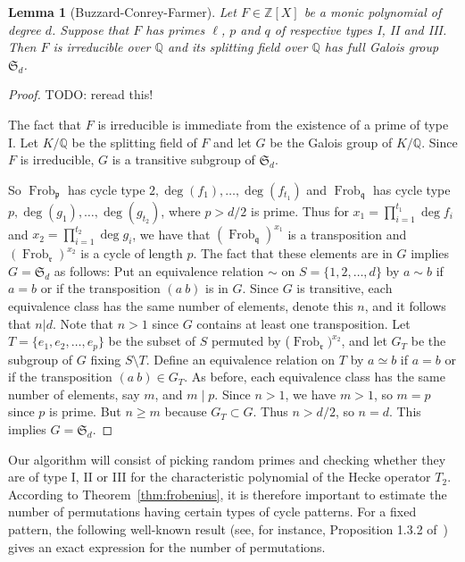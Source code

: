 \documentclass[11pt]{article}
\theoremstyle{plain}
\newtheorem{lemma}[theorem]{Lemma}
\theoremstyle{definition}
\theoremstyle{remark}
\numberwithin{equation}{section}
\newcommand{\ZZ}{\mathbb{Z}}
\newcommand{\QQ}{\mathbb{Q}}
\renewcommand{\SS}{\mathfrak{S}}
\newcommand{\Frob}{\operatorname{Frob}}
\begin{document}
\begin{lemma}[Buzzard-Conrey-Farmer]
  Let $F\in\ZZ[X]$ be a monic polynomial of degree $d$.  Suppose that $F$ has
  primes $\ell$, $p$ and $q$ of respective types I, II and III.  Then $F$
  is irreducible over $\QQ$ and its splitting field over $\QQ$ has full Galois
  group $\SS_d$.
\end{lemma}
\begin{proof}
  TODO: reread this!

  The fact that $F$ is irreducible is immediate from the existence of a prime of type
  I. 
  Let $K/\QQ$ be the splitting field of $F$ and let $G$ be the Galois group of
  $K/\QQ$.  Since $F$ is irreducible, $G$ is a transitive subgroup of $\SS_d$. 

  So $\Frob_{\mathfrak{p}}$ has cycle type $2,\deg(f_1),\ldots,\deg(f_{t_1})$ and
  $\Frob_{\mathfrak{q}}$ has cycle type $p,\deg(g_1),\ldots,\deg(g_{t_2})$, where 
  $p>d/2$ is prime. Thus for $x_1=\prod_{i=1}^{t_1}\deg f_i$ and $x_2=\prod_{i=1}^{t_2}\deg g_i$,
  we have that $(\Frob_{\mathfrak{q}})^{x_1}$ is a transposition and 
  $(\Frob_{\mathfrak{r}})^{x_2}$
  is a cycle of length $p$. The fact that these elements are in $G$ implies $G=\SS_d$ as follows:
  Put an equivalence relation $\sim$ on $S=\{1,2,\ldots,d\}$ by $a\sim b$ if $a=b$ or if the
  transposition $(a~b)$ is in $G$. Since $G$ is
  transitive, each equivalence class has the same number of elements, denote this
  $n$, and it follows that $n|d$. Note that $n>1$ since $G$ contains at least one
  transposition. Let $T=\{e_1,e_2,\ldots,e_p\}$ be the subset of $S$ permuted by
  ($\Frob_{\mathfrak{r}})^{x_2}$, and let $G_T$ be the subgroup of $G$ fixing $S\setminus T$.
  Define an equivalence relation on $T$ by $a\simeq b$ if $a=b$ or if the transposition
  $(a~b) \in G_T$. As before, each equivalence class has the same number of elements,
  say $m$, and $m\mid p$. Since $n>1$, we have $m>1$, so $m=p$ since $p$ is prime.
  But $n\geq m$ because $G_T\subset G$. Thus $n>d/2$, so $n=d$. This implies $G=\SS_d$. 
\end{proof}

Our algorithm will consist of picking random primes and checking whether they
are of type I, II or III for the characteristic polynomial of the Hecke
operator $T_2$.  According to Theorem~\ref{thm:frobenius}, 
it is therefore important to estimate the number of permutations having
certain types of cycle patterns.  For a fixed pattern, the following
well-known result 
(see, for instance, Proposition 1.3.2 of~\cite{Stanley1}) gives an exact
expression for the number of permutations.
\end{document}
